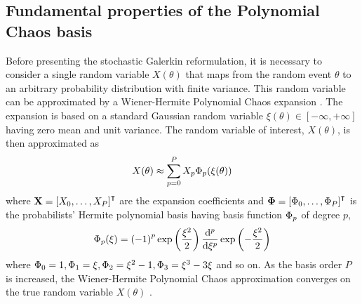 \subsection{Fundamental properties of the Polynomial Chaos basis}

Before presenting the stochastic Galerkin reformulation, it is necessary to consider a single random variable $X(\theta)$ that maps from the random event $\theta$ to an arbitrary probability distribution with finite variance.
This random variable can be approximated by a Wiener-Hermite Polynomial Chaos expansion \citep{xiu-karniadakis2002}.
The expansion is based on a standard Gaussian random variable $\xi(\theta) \in [-\infty, +\infty]$ having zero mean and unit variance.
The random variable of interest, $X(\theta)$, is then approximated as
\begin{align}
X(\theta) \approx \sum_{p=0}^P X_p \Phi_p(\xi(\theta))
\end{align}
where $\mathbf{X} = \left[ X_0, \ldots, X_P \right]^\intercal$ are the expansion coefficients and $\bm{\Phi} = \left[ \Phi_0, \ldots, \Phi_P \right]^\intercal$ is the probabilists' Hermite polynomial basis having basis function $\Phi_p$ of degree $p$,
\begin{align}
    \Phi_p(\xi) = \left( -1 \right)^p \exp \left(\frac{\xi^2}{2}\right)
    \frac{\mathrm{d}^p}{\mathrm{d} \xi^p} \exp \left(- \frac{\xi^2}{2} \right)
\end{align}
where $\Phi_0 = 1, \Phi_1 = \xi, \Phi_2 = \xi^2 - 1, \Phi_3 = \xi^3 - 3\xi$ and so on.
As the basis order $P$ is increased, the Wiener-Hermite Polynomial Chaos approximation converges on the true random variable $X(\theta)$ \citep{xiu-karniadakis2002}.

